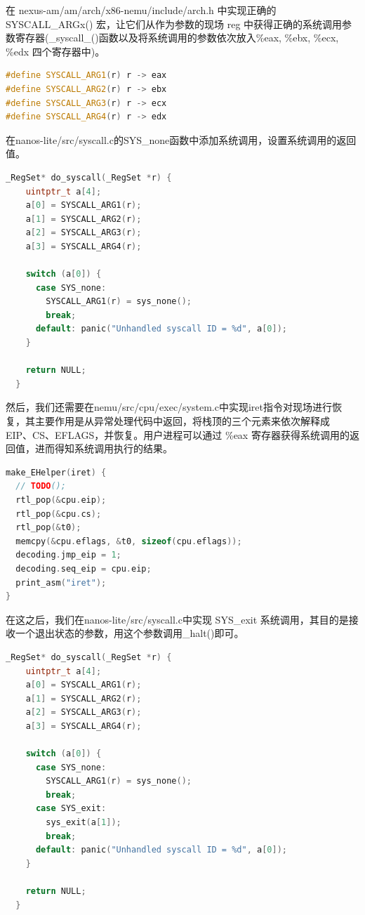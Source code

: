\documentclass[UTF8,a4paper,10pt]{ctexart}
\begin{document}
在 nexus-am/am/arch/x86-nemu/include/arch.h 中实现正确的 SYSCALL\_ARGx() 宏，让它们从作为参数的现场 reg 中获得正确的系统调用参数寄存器(\_syscall\_()函数以及将系统调用的参数依次放入\%eax, \%ebx, \%ecx, \%edx 四个寄存器中)。
\begin{lstlisting}[language = C++]
#define SYSCALL_ARG1(r) r -> eax
#define SYSCALL_ARG2(r) r -> ebx
#define SYSCALL_ARG3(r) r -> ecx
#define SYSCALL_ARG4(r) r -> edx
\end{lstlisting}


在nanos-lite/src/syscall.c的SYS\_none函数中添加系统调用，设置系统调用的返回值。
\begin{lstlisting}[language = C++]
_RegSet* do_syscall(_RegSet *r) {
    uintptr_t a[4];
    a[0] = SYSCALL_ARG1(r);
    a[1] = SYSCALL_ARG2(r);
    a[2] = SYSCALL_ARG3(r);
    a[3] = SYSCALL_ARG4(r);
  
    switch (a[0]) {
      case SYS_none: 
        SYSCALL_ARG1(r) = sys_none();
        break;
      default: panic("Unhandled syscall ID = %d", a[0]);
    }
  
    return NULL;
  }
\end{lstlisting}


然后，我们还需要在nemu/src/cpu/exec/system.c中实现iret指令对现场进行恢复，其主要作用是从异常处理代码中返回，将栈顶的三个元素来依次解释成 EIP、CS、EFLAGS，并恢复。用户进程可以通过 \%eax 寄存器获得系统调用的返回值，进而得知系统调用执行的结果。
\begin{lstlisting}[language = C++]
make_EHelper(iret) {
  // TODO();
  rtl_pop(&cpu.eip);
  rtl_pop(&cpu.cs);
  rtl_pop(&t0);
  memcpy(&cpu.eflags, &t0, sizeof(cpu.eflags));
  decoding.jmp_eip = 1;
  decoding.seq_eip = cpu.eip;
  print_asm("iret");
}
\end{lstlisting}

在这之后，我们在nanos-lite/src/syscall.c中实现 SYS\_exit 系统调用，其目的是接收一个退出状态的参数，用这个参数调用\_halt()即可。
\begin{lstlisting}[language = C++]
_RegSet* do_syscall(_RegSet *r) {
    uintptr_t a[4];
    a[0] = SYSCALL_ARG1(r);
    a[1] = SYSCALL_ARG2(r);
    a[2] = SYSCALL_ARG3(r);
    a[3] = SYSCALL_ARG4(r);
  
    switch (a[0]) {
      case SYS_none: 
        SYSCALL_ARG1(r) = sys_none();
        break;
      case SYS_exit: 
        sys_exit(a[1]);
        break;
      default: panic("Unhandled syscall ID = %d", a[0]);
    }
  
    return NULL;
  }  
\end{lstlisting}
\end{document}

